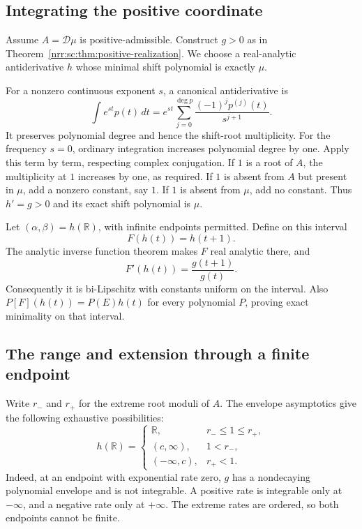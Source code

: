 \documentclass[11pt,letterpaper]{article}
\theoremstyle{definition}
\theoremstyle{remark}
\newcommand{\R}{\mathbb R}
\newcommand{\scD}{\mathcal D}
\begin{document}
\subsection{Integrating the positive coordinate}

Assume $A=\scD\mu$ is positive-admissible. Construct $g>0$ as in
Theorem~\ref{nrr:sc:thm:positive-realization}. We choose a real-analytic
antiderivative $h$ whose minimal shift polynomial is exactly $\mu$.

For a nonzero continuous exponent $s$, a canonical antiderivative is
\begin{equation}
 \int e^{st}p(t)\,dt
 =e^{st}\sum_{j=0}^{\deg p}\frac{(-1)^jp^{(j)}(t)}{s^{j+1}}.
 \label{nrr:sc:eq:primitive}
\end{equation}
It preserves polynomial degree and hence the shift-root multiplicity.
For the frequency $s=0$, ordinary integration increases polynomial
degree by one. Apply this term by term, respecting complex conjugation.
If $1$ is a root of $A$, the multiplicity at $1$ increases by one, as
required. If $1$ is absent from $A$ but present in $\mu$, add a nonzero
constant, say $1$. If $1$ is absent from $\mu$, add no constant.
Thus $h'=g>0$ and its exact shift polynomial is $\mu$.

Let $(\alpha,\beta)=h(\R)$, with infinite endpoints permitted.
Define on this interval
\begin{equation}
 F(h(t))=h(t+1).
 \label{nrr:sc:eq:conjugacy}
\end{equation}
The analytic inverse function theorem makes $F$ real analytic there,
and
\begin{equation}
 F'(h(t))=\frac{g(t+1)}{g(t)}.
 \label{nrr:sc:eq:Fprime}
\end{equation}
Consequently it is bi-Lipschitz with constants uniform on the interval.
Also $P[F](h(t))=P(E)h(t)$ for every polynomial $P$, proving exact
minimality on that interval.

\subsection{The range and extension through a finite endpoint}

Write $r_-$ and $r_+$ for the extreme root moduli of $A$.
The envelope asymptotics give the following exhaustive possibilities:
\begin{equation}
 h(\R)=
 \begin{cases}
 \R,&r_-\le1\le r_+,\\
 (c,\infty),&1<r_-,\\
 (-\infty,c),&r_+<1.
 \end{cases}
 \label{nrr:sc:eq:range}
\end{equation}
Indeed, at an endpoint with exponential rate zero, $g$ has a nondecaying
polynomial envelope and is not integrable. A positive rate is integrable
only at $-\infty$, and a negative rate only at $+\infty$.
The extreme rates are ordered, so both endpoints cannot be finite.
\end{document}

